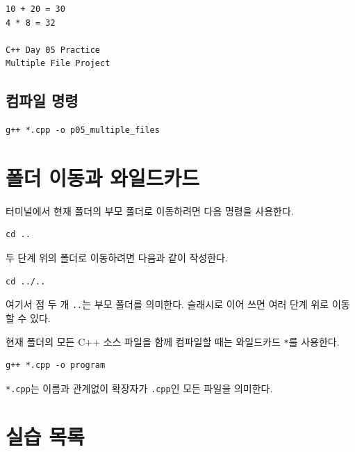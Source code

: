\documentclass[11pt,a4paper]{article}
\begin{document}
\begin{verbatim}
10 + 20 = 30
4 * 8 = 32

C++ Day 05 Practice
Multiple File Project
\end{verbatim}

\subsection{컴파일 명령}

\begin{verbatim}
g++ *.cpp -o p05_multiple_files
\end{verbatim}

\section{폴더 이동과 와일드카드}

터미널에서 현재 폴더의 부모 폴더로 이동하려면 다음 명령을 사용한다.

\begin{verbatim}
cd ..
\end{verbatim}

두 단계 위의 폴더로 이동하려면 다음과 같이 작성한다.

\begin{verbatim}
cd ../..
\end{verbatim}

여기서 점 두 개 \texttt{..}는 부모 폴더를 의미한다.
슬래시로 이어 쓰면 여러 단계 위로 이동할 수 있다.

현재 폴더의 모든 C++ 소스 파일을 함께 컴파일할 때는 와일드카드 \texttt{*}를 사용한다.

\begin{verbatim}
g++ *.cpp -o program
\end{verbatim}

\texttt{*.cpp}는 이름과 관계없이 확장자가 \texttt{.cpp}인 모든 파일을 의미한다.

\section{실습 목록}
\end{document}
